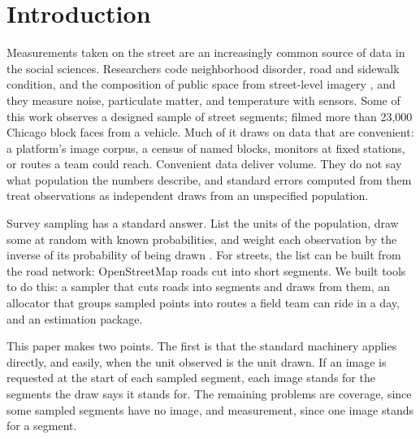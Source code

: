 \documentclass[11pt]{article}
\begin{document}
\section{Introduction}

Measurements taken on the street are an increasingly common source of data in the social sciences. Researchers code neighborhood disorder, road and sidewalk condition, and the composition of public space from street-level imagery \citep{rundle2011streetview,kelly2013streetview,naik2014streetscore,gebru2017streetview}, and they measure noise, particulate matter, and temperature with sensors. Some of this work observes a designed sample of street segments; \citet{sampson1999systematic} filmed more than 23,000 Chicago block faces from a vehicle. Much of it draws on data that are convenient: a platform's image corpus, a census of named blocks, monitors at fixed stations, or routes a team could reach. Convenient data deliver volume. They do not say what population the numbers describe, and standard errors computed from them treat observations as independent draws from an unspecified population.

Survey sampling has a standard answer. List the units of the population, draw some at random with known probabilities, and weight each observation by the inverse of its probability of being drawn \citep{horvitz1952generalization,cochran1977sampling,lohr2021sampling}. For streets, the list can be built from the road network: OpenStreetMap roads \citep{openstreetmap} cut into short segments. We built tools to do this: a sampler that cuts roads into segments and draws from them, an allocator that groups sampled points into routes a field team can ride in a day, and an estimation package.

This paper makes two points. The first is that the standard machinery applies directly, and easily, when the unit observed is the unit drawn. If an image is requested at the start of each sampled segment, each image stands for the segments the draw says it stands for. The remaining problems are coverage, since some sampled segments have no image, and measurement, since one image stands for a segment.
\end{document}
